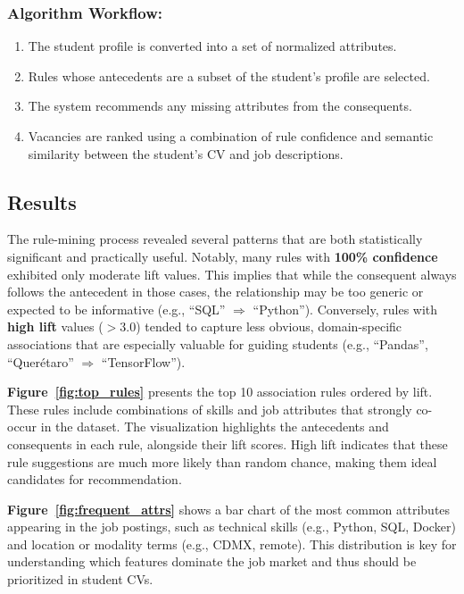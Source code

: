\documentclass{svproc} %
\begin{document}
	
	
	\vspace{0.5em}
	
	
	\subsubsection{Algorithm Workflow:}
	\begin{enumerate}
		\item The student profile is converted into a set of normalized attributes.
		\item Rules whose antecedents are a subset of the student's profile are selected.
		\item The system recommends any missing attributes from the consequents.
		\item Vacancies are ranked using a combination of rule confidence and semantic similarity between the student's CV and job descriptions.
	\end{enumerate}
	
	\subsection{Results}
	
	The rule-mining process revealed several patterns that are both statistically significant and practically useful. Notably, many rules with \textbf{100\% confidence} exhibited only moderate lift values. This implies that while the consequent always follows the antecedent in those cases, the relationship may be too generic or expected to be informative (e.g., “SQL” $\Rightarrow$ “Python”). Conversely, rules with \textbf{high lift} values ($> 3.0$) tended to capture less obvious, domain-specific associations that are especially valuable for guiding students (e.g., “Pandas”, “Querétaro” $\Rightarrow$ “TensorFlow”).
	
	\textbf{Figure~\ref{fig:top_rules}} presents the top 10 association rules ordered by lift. These rules include combinations of skills and job attributes that strongly co-occur in the dataset. The visualization highlights the antecedents and consequents in each rule, alongside their lift scores. High lift indicates that these rule suggestions are much more likely than random chance, making them ideal candidates for recommendation.
	
	\textbf{Figure~\ref{fig:frequent_attrs}} shows a bar chart of the most common attributes appearing in the job postings, such as technical skills (e.g., Python, SQL, Docker) and location or modality terms (e.g., CDMX, remote). This distribution is key for understanding which features dominate the job market and thus should be prioritized in student CVs.
	
\end{document}
